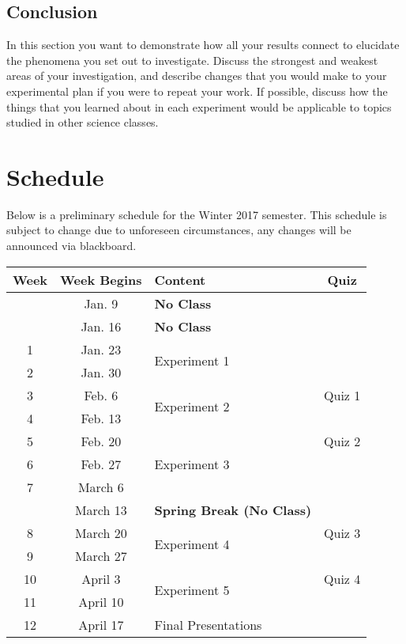\subsection*{Conclusion}
In this section you want to demonstrate how all your results connect to elucidate the phenomena you set out to investigate.
Discuss the strongest and weakest areas of your investigation, and describe changes that you would make to your experimental plan if you were to repeat your work.
If possible, discuss how the things that you learned about in each experiment would be applicable to topics studied in other science classes.

\section*{Schedule}
Below is a preliminary schedule for the Winter 2017 semester.
This schedule is subject to change due to unforeseen circumstances, any changes will be announced via blackboard. \\

\begin{tabular}{ |c|c|l|c| } 
 \hline
 \textbf{Week} & \textbf{Week Begins} & \textbf{Content}  & \textbf{Quiz} \\ 
 \hline
    & Jan. 9 & \textbf{No Class} & \\ 
 \hline 
    & Jan. 16 & \textbf{No Class} & \\ 
 \hline
 1 & Jan. 23 & \multirow{2}{*}{Experiment 1} & \\ 
 \cline{1-2} \cline{4-4}
 2 & Jan. 30 & & \\ 
 \hline
 3 & Feb. 6 & \multirow{2}{*}{Experiment 2} & Quiz 1 \\ 
 \cline{1-2} \cline{4-4}
 4 & Feb. 13 & & \\ 
 \hline
 5 & Feb. 20 & \multirow{3}{*}{Experiment 3} & Quiz 2 \\ 
 \cline{1-2} \cline{4-4}
 6 & Feb. 27 & & \\ 
 \cline{1-2} \cline{4-4}
 7 & March 6 & & \\ 
 \hline
   & March 13 & \textbf{Spring Break (No Class)} & \\ 
 \hline
 8 & March 20 & \multirow{2}{*}{Experiment 4} & Quiz 3 \\ 
 \cline{1-2} \cline{4-4}
 9 & March 27 & & \\ 
 \hline
 10 & April 3 & \multirow{2}{*}{Experiment 5} & Quiz 4 \\ 
 \cline{1-2} \cline{4-4}
 11 & April 10 & & \\ 
 \hline
 12 & April 17 & Final Presentations & \\ 
 \hline
\end{tabular}

